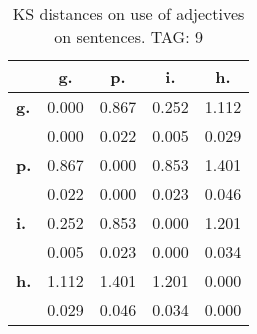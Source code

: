 \begin{table}[h!]
\begin{center}
\begin{tabular}{| l || c | c | c | c |}\hline
 & {\bf g.} & {\bf p.} & {\bf i.} & {\bf h.} \\\hline\hline
{\bf g.} & 0.000 & 0.867 & 0.252 & 1.112 \\
{\bf } & 0.000 & 0.022 & 0.005 & 0.029 \\\hline
{\bf p.} & 0.867 & 0.000 & 0.853 & 1.401 \\
{\bf } & 0.022 & 0.000 & 0.023 & 0.046 \\\hline
{\bf i.} & 0.252 & 0.853 & 0.000 & 1.201 \\
{\bf } & 0.005 & 0.023 & 0.000 & 0.034 \\\hline
{\bf h.} & 1.112 & 1.401 & 1.201 & 0.000 \\
{\bf } & 0.029 & 0.046 & 0.034 & 0.000 \\\hline
\end{tabular}
\caption{KS distances on use of adjectives on sentences. TAG: 9}
\end{center}
\end{table}